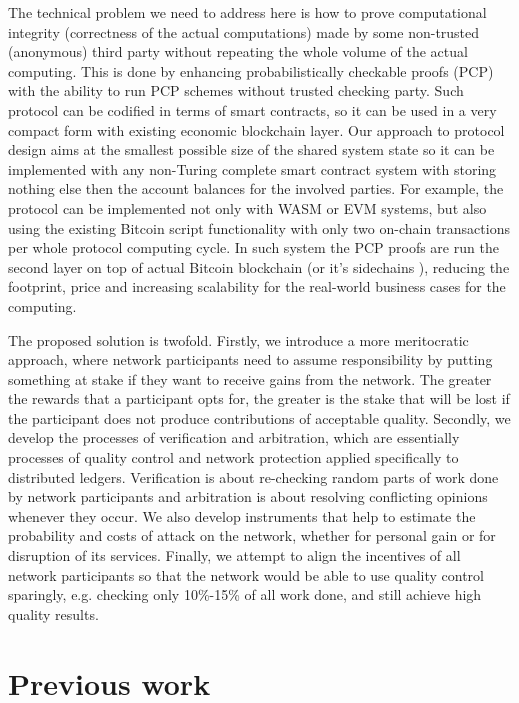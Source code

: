 \documentclass[conference]{IEEEtran}
\begin{document}
The technical problem we need to address here is how to prove computational integrity (correctness of the actual computations) made by some non-trusted (anonymous) third party without repeating the whole volume of the actual computing. This is done by enhancing probabilistically checkable proofs (PCP) \cite{pcp, pcpibm} with the ability to run PCP schemes without trusted checking party. Such protocol can be codified in terms of smart contracts, so it can be used in a very compact form with existing economic blockchain layer. Our approach to protocol design aims at the smallest possible size of the shared system state so it can be implemented with any non-Turing complete smart contract system with storing nothing else then the account balances for the involved parties. For example, the protocol can be implemented not only with WASM \cite{webassembly} or EVM \cite{evm} systems, but also using the existing Bitcoin script functionality with only two on-chain transactions per whole protocol computing cycle. In such system the PCP proofs are run the second layer on top of actual Bitcoin blockchain (or it's sidechains \cite{sidechains, typhon}), reducing the footprint, price and increasing scalability for the real-world business cases for the computing. 

The proposed solution is twofold. Firstly, we introduce a more meritocratic approach, where network participants need to assume responsibility by putting something at stake if they want to receive gains from the network. The greater the rewards that a participant opts for, the greater is the stake that will be lost if the participant does not produce contributions of acceptable quality. Secondly, we develop the processes of verification and arbitration, which are essentially processes of quality control and network protection applied specifically to distributed ledgers. Verification is about re-checking random parts of work done by network participants and arbitration is about resolving conflicting opinions whenever they occur. We also develop instruments that help to estimate the probability and costs of attack on the network, whether for personal gain or for disruption of its services. Finally, we attempt to align the incentives of all network participants so that the network would be able to use quality control sparingly, e.g. checking only 10\%-15\% of all work done, and still achieve high quality results.


\section{Previous work}
\label{previouswork}
\end{document}
